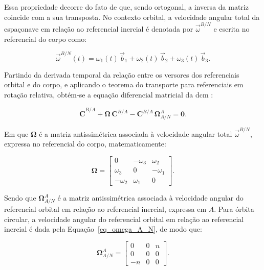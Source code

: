 Essa propriedade decorre do fato de que, sendo ortogonal, a inversa da matriz coincide com a sua transposta.
No contexto orbital, a velocidade angular total da espaçonave em relação ao referencial inercial é denotada por $\vec{\omega}^{B/N}$ e escrita no referencial do corpo como:

\begin{equation}
\vec{\omega}^{B/N}(t)
=
\omega_1(t)\,\vec{b}_1
+
\omega_2(t)\,\vec{b}_2
+
\omega_3(t)\,\vec{b}_3.
\label{eq_omega_BN_corpo_dcm}
\end{equation}

Partindo da derivada temporal da relação entre os versores dos referenciais orbital e do corpo, e aplicando o teorema do transporte para referenciais em rotação relativa, obtém-se a equação diferencial matricial da \gls{dcm} \cite{wie2008space}:

\begin{equation}
\dot{\mathbf{C}}^{B/A}
+
\boldsymbol{\Omega}\,\mathbf{C}^{B/A}
-
\mathbf{C}^{B/A}\,\boldsymbol{\Omega}_{A/N}^{A}
=
\mathbf{0}.
\label{eq:cinematica_dcm_orbital}
\end{equation}

Em que $\boldsymbol{\Omega}$ é a matriz antissimétrica associada à velocidade angular total $\vec{\omega}^{B/N}$, expressa no referencial do corpo, matematicamente:

\begin{equation}
\boldsymbol{\Omega}
=
\begin{bmatrix}
0 & -\omega_3 & \omega_2 \\
\omega_3 & 0 & -\omega_1 \\
-\omega_2 & \omega_1 & 0
\end{bmatrix}.
\label{eq:def_omega_matriz_orbital}
\end{equation}

Sendo que $\boldsymbol{\Omega}_{A/N}^{A}$ é a matriz antissimétrica associada à velocidade angular do referencial orbital em relação ao referencial inercial, expressa em $A$.
Para órbita circular, a velocidade angular do referencial orbital em relação ao referencial inercial é dada pela Equação~\eqref{eq_omega_A_N}, de modo que:

\begin{equation}
\boldsymbol{\Omega}_{A/N}^{A}
=
\begin{bmatrix}
0 & 0 & n \\
0 & 0 & 0 \\
-n & 0 & 0
\end{bmatrix}.
\label{eq:omega_A_N_matriz}
\end{equation}

